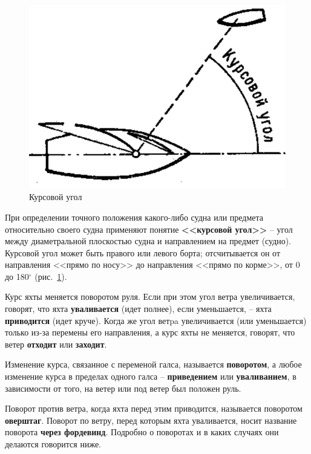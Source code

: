 \documentclass[a4paper, 12pt, twoside, final]{scrbook}
\begin{document}
\begin{figure}[htbp]
   \centering
   \includegraphics{pics/102_Kursovoj_ugol} %
   \caption{Курсовой угол}
   \label{fig:102}
\end{figure}

При определении точного положения какого-либо судна или предмета относительно своего судна применяют понятие \textbf{<<курсовой угол>>} \--- угол между диаметральной плоскостью судна и направлением на предмет (судно). Курсовой угол может быть правого или левого борта; отсчитывается он от направления <<прямо по носу>> до направления <<прямо по корме>>, от 0 до 180$^\circ$ (рис.~\ref{fig:102}).

Курс яхты меняется поворотом руля. Если при этом угол ветра увеличивается, говорят, что яхта \textbf{уваливается} (идет полнее), если уменьшается, \--- яхта \textbf{приводится} (идет круче). Когда же угол ветpa увеличивается (или уменьшается) только из-за перемены его направления, а курс яхты не меняется, говорят, что ветер \textbf{отходит} или \textbf{заходит}.

Изменение курса, связанное с переменой галса, называется \textbf{поворотом}, а любое изменение курса в пределах одного галса \--- \textbf{приведением} или \textbf{уваливанием}, в зависимости от того, на ветер или под ветер был положен руль. 

Поворот против ветра, когда яхта перед этим приводится, называется поворотом \textbf{оверштаг}. Поворот по ветру, перед которым яхта уваливается, носит название поворота \textbf{через фордевинд}. Подробно о поворотах и в каких случаях они делаются говорится ниже.
\end{document}
